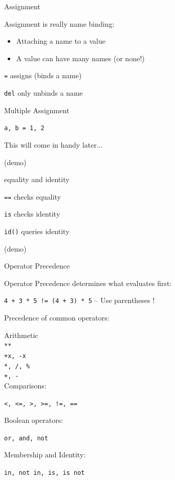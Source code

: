 \documentclass{beamer}
\begin{document}
\begin{frame}[fragile]{Assignment}

{\Large Assignment is really name binding: }
\begin{itemize}
  \item Attaching a name to a value
  \item A value can have many names (or none!)
\end{itemize}

{\large
\vspace{0.1in}
\verb+=+ assigns (binds a name)

\vspace{0.1in}
\verb+del+ only unbinds a name

\vspace{0.1in}
{\Large  Multiple Assignment}

\vspace{0.1in}

\verb+a, b = 1, 2+

\vspace{0.1in}
This will come in handy later...
}

\vspace{0.1in}
(demo)

\end{frame}

\begin{frame}[fragile]{equality and identity}

{\large
\vspace{0.1in}
\verb+==+ checks equality

\vspace{0.1in}
\verb+is+ checks identity

\vspace{0.1in}
\verb+id()+ queries identity
}

\vspace{0.2in}
(demo)


\end{frame}


\begin{frame}[fragile]{Operator Precedence}

{Operator Precedence determines what evaluates first:}

\verb^4 + 3 * 5 != (4 + 3) * 5^  --  Use parentheses !

Precedence of common operators:

Arithmetic \\
\verb!**! \\
\verb!+x, -x! \\	
\verb!*, /, %!	\\
\verb!+, -! \\

Comparisons:

\verb^<, <=, >, >=, !=, ==^

Boolean operators:
 
\verb!or, and, not!

Membership and Identity:

\verb!in, not in, is, is not!

\end{frame}
\end{document}

